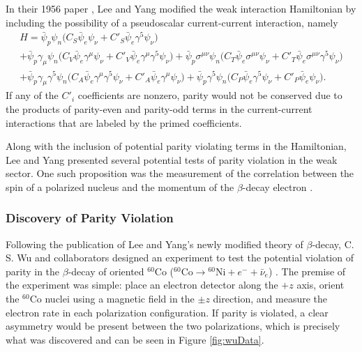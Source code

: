 In their 1956 paper \cite{leeyang1956}, Lee and Yang modified the weak interaction Hamiltonian
by including the possibility of a pseudoscalar current-current interaction, namely
%
\begin{multline}
  H = \bar{\psi}_p \psi_n \big( C_S\bar{\psi}_e  \psi_\nu + C'_S\bar{\psi}_e \gamma^5 \psi_\nu \big) \\
  + \bar{\psi}_p \gamma_\mu \psi_n  \big( C_V\bar{\psi}_e \gamma^\mu \psi_\nu + C'_V\bar{\psi}_e \gamma^\mu \gamma^5 \psi_\nu \big) 
  + \bar{\psi}_p \sigma^{\mu\nu} \psi_n \big( C_T\bar{\psi}_e \sigma^{\mu\nu} \psi_\nu + C'_T\bar{\psi}_e \sigma^{\mu\nu} \gamma^5 \psi_\nu \big)\\
  + \bar{\psi}_p \gamma_\mu \gamma^5 \psi_n \big( C_A\bar{\psi}_e \gamma^\mu \gamma^5 \psi_\nu + C'_A\bar{\psi}_e \gamma^\mu \psi_\nu \big) 
  + \bar{\psi}_p  \gamma^5 \psi_n \big( C_P\bar{\psi}_e  \gamma^5 \psi_\nu + C'_P\bar{\psi}_e \psi_\nu \big).
  \label{eq:leeyang}
\end{multline}
%
If any of the $C'_i$ coefficients are nonzero, parity would not be conserved due to
the products of parity-even and parity-odd terms in the current-current interactions that are labeled by
the primed coefficients.

Along with the inclusion of potential parity violating terms in the Hamiltonian, Lee and Yang
presented several potential tests of parity violation in the weak sector. One such proposition
was the measurement of the correlation between the spin of a polarized nucleus and
the momentum of the $\beta$-decay electron \cite{leeyang1956}.

\subsubsection{Discovery of Parity Violation}

Following the publication of Lee and Yang's newly modified theory of $\beta$-decay, C. S. Wu
and collaborators designed an experiment to test the potential violation
of parity in the $\beta$-decay of oriented $^{60}\mathrm{Co}$
($^{60}\mathrm{Co} \rightarrow {^{60}\mathrm{Ni}} + e^- + \bar{\nu}_e$) \cite{wu1957}. The premise of the experiment
was simple: place an electron detector along the $+z$ axis, orient the $^{60}\mathrm{Co}$ nuclei
using a magnetic field in the $\pm z$ direction, and measure the electron rate in each polarization
configuration. If parity is violated, a clear asymmetry would be present between the two polarizations,
which is precisely what was discovered and can be seen in Figure \ref{fig:wuData}.

